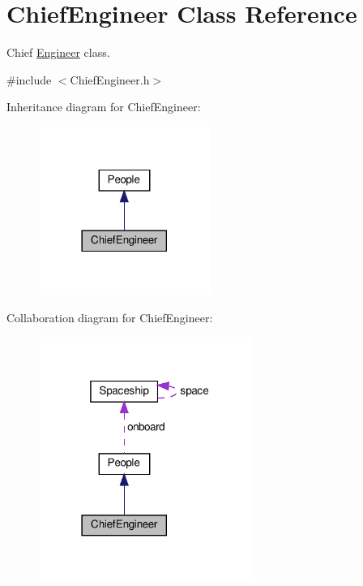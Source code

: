 \hypertarget{classChiefEngineer}{}\section{Chief\+Engineer Class Reference}
\label{classChiefEngineer}


Chief \hyperlink{classEngineer}{Engineer} class.  




{\ttfamily \#include $<$Chief\+Engineer.\+h$>$}



Inheritance diagram for Chief\+Engineer\+:\nopagebreak
\begin{figure}[H]
\begin{center}
\leavevmode
\includegraphics[width=158pt]{classChiefEngineer__inherit__graph}
\end{center}
\end{figure}


Collaboration diagram for Chief\+Engineer\+:\nopagebreak
\begin{figure}[H]
\begin{center}
\leavevmode
\includegraphics[width=198pt]{classChiefEngineer__coll__graph}
\end{center}
\end{figure}
